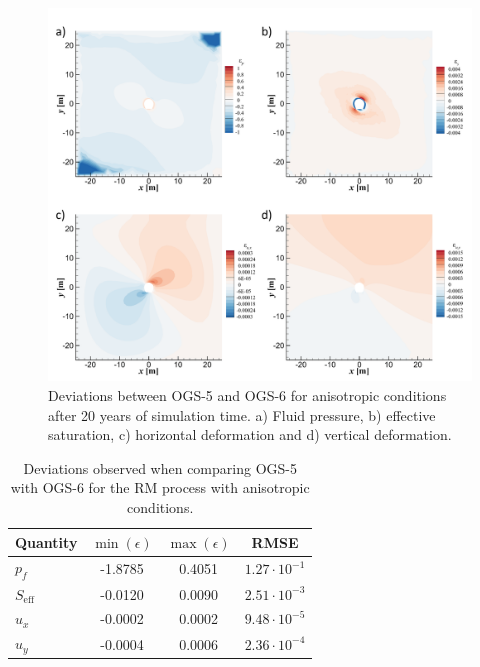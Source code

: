 \begin{figure}[t]
\includegraphics[width=\textwidth]{./figures/MEX10_RM_error_2d_anisotropic.png}
\caption{Deviations between OGS-5 and OGS-6 for anisotropic conditions after 20 years of simulation time.  a) Fluid pressure, b) effective saturation, c) horizontal deformation and d) vertical deformation.}
\label{fig:RM_error_2d_anisotropic}
\end{figure}

\begin{table}
 \caption{Deviations observed when comparing OGS-5 with OGS-6 for the RM process with anisotropic conditions.\label{tab:error_RM_anisotropic}}
\begin{center}
\begin{tabular}{ l | c | c | c }
 Quantity				& $\min{(\epsilon)}$ 	& $\max{(\epsilon)}$	 & RMSE  \\
 \hline
 $p_f$				 	& -1.8785 				& 0.4051 		& $1.27\cdot 10^{-1}$\\ 
 $S_\text{eff}$ 		& -0.0120 				& 0.0090		& $2.51\cdot 10^{-3}$\\		
 $u_x$					& -0.0002 				& 0.0002		& $9.48\cdot 10^{-5}$\\		 
 $u_y$ 					& -0.0004 				& 0.0006		& $2.36\cdot 10^{-4}$\\	
\end{tabular}
\end{center}
\end{table}


